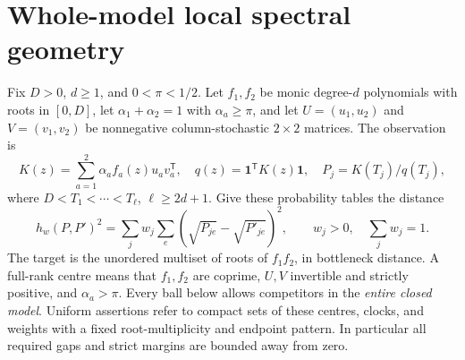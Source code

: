 \documentclass[11pt,reqno]{amsart}
\numberwithin{equation}{section}
\theoremstyle{definition}
\theoremstyle{remark}
\newcommand{\one}{\mathbf 1}
\begin{document}
\section{Whole-model local spectral geometry}\label{sec:local}
Fix $D>0$, $d\ge1$, and $0<\pi<1/2$. Let $f_1,f_2$ be monic degree-$d$ polynomials with roots in $[0,D]$, let $\alpha_1+\alpha_2=1$ with $\alpha_a\ge\pi$, and let $U=(u_1,u_2)$ and $V=(v_1,v_2)$ be nonnegative column-stochastic $2\times2$ matrices. The observation is
\begin{equation}\label{eq:binary}
 K(z)=\sum_{a=1}^2\alpha_a f_a(z)u_av_a^{\mathsf T},\quad
 q(z)=\one^{\mathsf T}K(z)\one,\quad P_j=K(T_j)/q(T_j),
\end{equation}
where $D<T_1<\cdots<T_\ell$, $\ell\ge2d+1$. Give these probability tables the distance
\[
 h_w(P,P')^2=\sum_j w_j\sum_e(\sqrt{P_{je}}-\sqrt{P'_{je}})^2,
 \qquad w_j>0,\quad\sum_jw_j=1.
\]
The target is the unordered multiset of roots of $f_1f_2$, in bottleneck distance. A full-rank centre means that $f_1,f_2$ are coprime, $U,V$ invertible and strictly positive, and $\alpha_a>\pi$. Every ball below allows competitors in the \emph{entire closed model}. Uniform assertions refer to compact sets of these centres, clocks, and weights with a fixed root-multiplicity and endpoint pattern. In particular all required gaps and strict margins are bounded away from zero.
\end{document}
